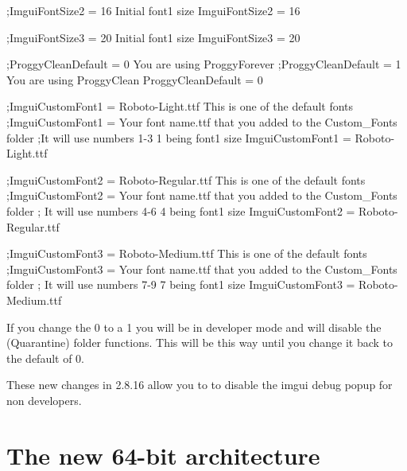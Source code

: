 \documentclass[11pt,parskip=half,a4paper]{scrartcl}
\begin{document}
;ImguiFontSize2 = 16 Initial font1 size \newline
ImguiFontSize2 = 16 \newline

;ImguiFontSize3 = 20 Initial font1 size \newline
ImguiFontSize3 = 20 \newline

;ProggyCleanDefault = 0 You are using ProggyForever \newline
;ProggyCleanDefault = 1 You are using ProggyClean \newline
ProggyCleanDefault = 0 \newline

\newpage

;ImguiCustomFont1 = Roboto-Light.ttf This is one of the default fonts \newline
;ImguiCustomFont1 = Your font name.ttf that you added to the Custom\_Fonts folder \newline
;It will use numbers 1-3  1 being font1 size \newline
ImguiCustomFont1 = Roboto-Light.ttf \newline

;ImguiCustomFont2 = Roboto-Regular.ttf This is one of the default fonts \newline
;ImguiCustomFont2 = Your font name.ttf that you added to the Custom\_Fonts folder \newline
; It will use numbers 4-6  4 being font1 size \newline
ImguiCustomFont2 = Roboto-Regular.ttf \newline

;ImguiCustomFont3 = Roboto-Medium.ttf This is one of the default fonts \newline
;ImguiCustomFont3 = Your font name.ttf that you added to the Custom\_Fonts folder \newline
; It will use numbers 7-9  7 being font1 size \newline
ImguiCustomFont3 = Roboto-Medium.ttf

If you change the 0 to a 1 you will be in developer mode and will disable the (Quarantine) folder
functions. This will be this way until you change it back to the default of 0.

These new changes in 2.8.16 allow you to to disable the imgui debug popup for non developers.

\newpage
\section{The new 64-bit architecture}
\end{document}
